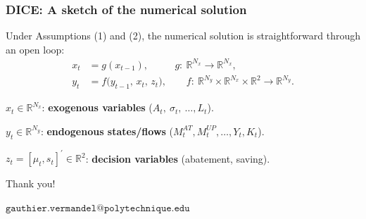 \documentclass[xcolor=x11names,compress,aspectratio=169]{beamer}%
\makeatletter
\renewenvironment{itemize}{\begin{compactitemize}[<+-| alert@+>]}{\end{compactitemize}}
\makeatother
\begin{document}
\begin{frame}%
%

\frametitle{DICE: A sketch of the numerical solution}%


Under Assumptions (1) and (2), the numerical solution is straightforward
through an open loop:
\begin{align*}
x_{t}  &  =g(x_{t-1}),\qquad\text{\ \ \ \ \ \ \ \ \ }g:\ \mathbb{R}^{N_{x}%
}\rightarrow\mathbb{R}^{N_{x}},\\[0.3em]
y_{t}  &  =f\big(y_{t-1},\,x_{t},\,z_{t}\big),\qquad f:\ \mathbb{R}^{N_{y}%
}\times\mathbb{R}^{N_{x}}\times\mathbb{R}^{2}\rightarrow\mathbb{R}^{N_{y}}.
\end{align*}


\begin{itemize}
\item $x_{t}\in\mathbb{R}^{N_{x}}$: \textbf{exogenous variables}
($A_{t},\ \sigma_{t},\ \ldots, L_{t}$).

\item $y_{t}\in\mathbb{R}^{N_{y}}$: \textbf{endogenous states/flows}
($M_{t}^{AT},M_{t}^{UP},\ldots,Y_{t},K_{t}$).

\item $z_{t}=[\mu_{t},s_{t}]^{\prime}\in\mathbb{R}^{2}$: \textbf{decision
variables} (abatement, saving).
\end{itemize}

%

\transboxout
\end{frame}%
%

\begin{frame}%


\begin{center}
Thank you!

\vspace{5ex}

$\mathtt{gauthier.vermandel@polytechnique.edu}$
\end{center}

%

\transboxout
\end{frame}%
%


%
\end{document}
